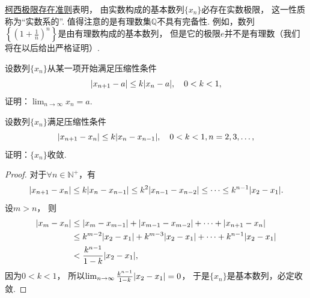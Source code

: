 \hyperref[theorem:极限.数列的柯西极限存在准则]{柯西极限存在准则}表明，
由实数构成的基本数列\(\{x_n\}\)必存在实数极限，
这一性质称为“实数系的”.
值得注意的是有理数集\(\mathbb{Q}\)不具有完备性.
例如，数列\(\left\{\left(1+\frac1n\right)^n\right\}\)是由有理数构成的基本数列，
但是它的极限\(e\)并不是有理数（我们将在以后给出严格证明）.%

\begin{example}\label{example:收敛准则.压缩映射原理1}
设数列\(\{x_n\}\)从某一项开始满足压缩性条件\begin{equation*}
	\abs{x_{n+1} - a}
	\leq k \abs{x_n - a},
	\quad 0<k<1,
\end{equation*}
证明：\(\lim_{n\to\infty} x_n = a\).
\end{example}

\begin{example}\label{example:收敛准则.压缩映射原理2}
设数列\(\{x_n\}\)满足压缩性条件\begin{equation*}
	\abs{x_{n+1} - x_n}
	\leq k \abs{x_n - x_{n-1}},
	\quad 0<k<1, n=2,3,\dotsc,
\end{equation*}
证明：\(\{x_n\}\)收敛.
\begin{proof}
对于\(\forall n\in\mathbb{N}^+\)，有\begin{equation*}
	\abs{x_{n+1} - x_n}
	\leq k \abs{x_n - x_{n-1}}
	\leq k^2 \abs{x_{n-1} - x_{n-2}}
	\leq \dotsb
	\leq k^{n-1} \abs{x_2 - x_1}.
\end{equation*}
设\(m > n\)，
则\begin{align*}
	\abs{x_m - x_n}
	&\leq \abs{x_m - x_{m-1}}
	+ \abs{x_{m-1} - x_{m-2}}
	+ \dotsb + \abs{x_{n+1} - x_n} \\
	&\leq k^{m-2} \abs{x_2 - x_1}
	+ k^{m-3} \abs{x_2 - x_1}
	+ \dotsb + k^{n-1} \abs{x_2 - x_1} \\
	&< \frac{k^{n-1}}{1-k} \abs{x_2 - x_1},
\end{align*}
因为\(0<k<1\)，
所以\(\lim_{n\to\infty} \frac{k^{n-1}}{1-k} \abs{x_2 - x_1} = 0\)，
于是\(\{x_n\}\)是基本数列，必定收敛.
\end{proof}
\end{example}
